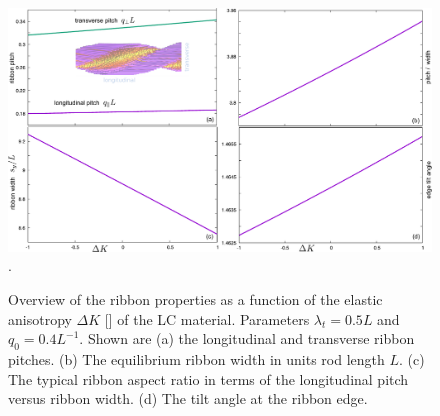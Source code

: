 \begin{figure}
\begin{center}
\includegraphics[width=   \columnwidth]{figures/chapter-5/deltak}.
\caption{ \label{ribbontheory} Overview of the ribbon properties as a function of the elastic anisotropy $\Delta K$ [] of the LC material. Parameters $\lambda_{t} = 0.5 L$ and $q_{0} = 0.4 L^{-1}$. Shown are (a) the longitudinal and transverse ribbon pitches. (b) The equilibrium ribbon width in units rod length $L$. (c) The typical ribbon aspect ratio in terms of the longitudinal pitch versus ribbon width. (d) The tilt angle at the ribbon edge.   }
\end{center}
\end{figure}


